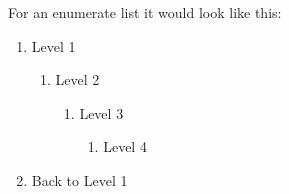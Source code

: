 \documentclass{article}
\begin{document}
For an enumerate list it would look like this:
\begin{enumerate}
    \item Level 1
    \begin{enumerate}
        \item Level 2
        \begin{enumerate}
            \item Level 3
            \begin{enumerate}
                \item Level 4
            \end{enumerate}
        \end{enumerate}
    \end{enumerate}
    \item Back to Level 1
\end{enumerate}

\newpage



\end{document}
